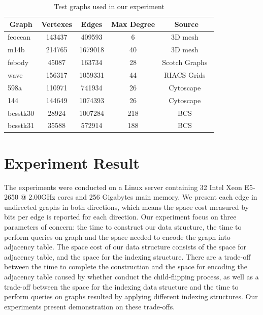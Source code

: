 \documentclass[12pt,glossary]{dalthesis}
\begin{document}
\begin{table}[ht]
\centering
\caption{ Test graphs used in our experiment }
\label{graph-list}
\begin{tabular}{|l||c|c|c|c|}
\hline
\multicolumn{1}{|c||}{Graph} & Vertexes & Edges   & Max Degree & Source        \\ \hline
feocean                   & 143437   & 409593  & 6          & 3D mesh~\cite{3DMESH}        \\
m14b                      & 214765   & 1679018 & 40         & 3D mesh~\cite{3DMESH}       \\
febody                    & 45087    & 163734  & 28         & Scotch Graphs~\cite{Scotch} \\ 
wave                      & 156317   & 1059331 & 44         & RIACS Grids~\cite{RIACS}    \\
598a                      & 110971   & 741934  & 26         & Cytoscape~\cite{Cytoscape}      \\
144                       & 144649   & 1074393 & 26         & Cytoscape~\cite{Cytoscape}     \\
bcsstk30                  & 28924    & 1007284 & 218        & BCS~\cite{Matrix}    \\
bcsstk31                  & 35588    & 572914  & 188        & BCS~\cite{Matrix}     \\ \hline
\end{tabular}
\end{table}


\section{Experiment Result} 
The experiments were conducted on a Linux server containing 32 Intel Xeon E5-2650 @ 2.00GHz cores and 256 Gigabytes main memory.
We present each edge in undirected graphs in both directions, which means the space cost measured by bits per edge is reported for each direction. Our experiment focus on three parameters of concern: the time to construct our data structure, the time to perform queries on graph and the space needed to encode the graph into adjacency table. The space cost of our data structure consists of the space for adjacency table, and the space for the indexing structure. There are a trade-off between the time to complete the construction and the space for encoding the adjacency table caused by whether conduct the child-flipping process, as well as a trade-off between the space for the indexing data structure and the time to perform queries on graphs resulted by applying different indexing structures. Our experiments present demonstration on these trade-offs.
\end{document}
